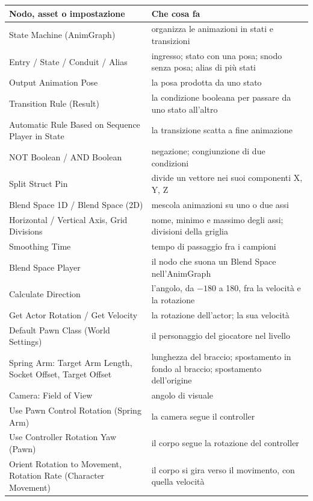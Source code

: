 \begin{table}[htbp]
\centering
\small
\begin{tabular}{@{}p{4.8cm}p{9.2cm}@{}}
\toprule
\textbf{Nodo, asset o impostazione} & \textbf{Che cosa fa} \\
\midrule
State Machine (AnimGraph) & organizza le animazioni in stati e transizioni \\
Entry / State / Conduit / Alias & ingresso; stato con una posa; snodo senza posa; alias
di più stati \\
Output Animation Pose & la posa prodotta da uno stato \\
Transition Rule (Result) & la condizione booleana per passare da uno stato all'altro \\
Automatic Rule Based on Sequence Player in State & la transizione scatta a fine
animazione \\
NOT Boolean / AND Boolean & negazione; congiunzione di due condizioni \\
Split Struct Pin & divide un vettore nei suoi componenti X, Y, Z \\
Blend Space 1D / Blend Space (2D) & mescola animazioni su uno o due assi \\
Horizontal / Vertical Axis, Grid Divisions & nome, minimo e massimo degli assi;
divisioni della griglia \\
Smoothing Time & tempo di passaggio fra i campioni \\
Blend Space Player & il nodo che suona un Blend Space nell'AnimGraph \\
Calculate Direction & l'angolo, da $-180$ a 180, fra la velocità e la rotazione \\
Get Actor Rotation / Get Velocity & la rotazione dell'actor; la sua velocità \\
Default Pawn Class (World Settings) & il personaggio del giocatore nel livello \\
Spring Arm: Target Arm Length, Socket Offset, Target Offset & lunghezza del braccio;
spostamento in fondo al braccio; spostamento dell'origine \\
Camera: Field of View & angolo di visuale \\
Use Pawn Control Rotation (Spring Arm) & la camera segue il controller \\
Use Controller Rotation Yaw (Pawn) & il corpo segue la rotazione del controller \\
Orient Rotation to Movement, Rotation Rate (Character Movement) & il corpo si gira verso
il movimento, con quella velocità \\

\end{tabular}
\end{table}
